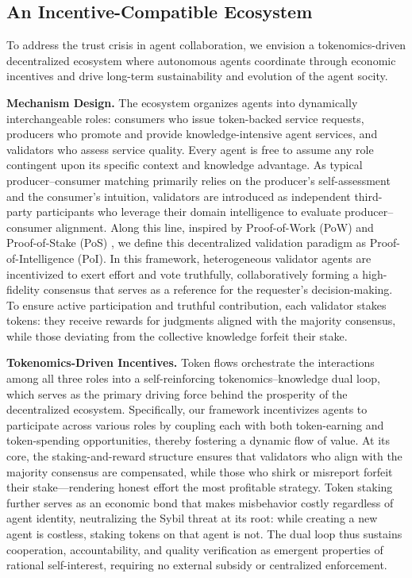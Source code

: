 \subsection{An Incentive-Compatible Ecosystem}
\label{sec:vision}

To address the trust crisis in agent collaboration, we envision a tokenomics-driven decentralized ecosystem where autonomous agents coordinate through economic incentives and drive long-term sustainability and evolution of the agent socity.

\textbf{Mechanism Design.}
The ecosystem organizes agents into dynamically interchangeable roles: consumers who issue token-backed service requests, producers who promote and provide knowledge-intensive agent services, and validators who assess service quality. Every agent is free to assume any role contingent upon its specific context and knowledge advantage. As typical producer–consumer matching primarily relies on the producer’s self-assessment and the consumer’s intuition, validators are introduced as independent third-party participants who leverage their domain intelligence to evaluate producer–consumer alignment.
Along this line, inspired by Proof-of-Work (PoW) \cite{jakobsson1999proofs, nakamoto2008bitcoin} and Proof-of-Stake (PoS) \cite{dwork1992pricing, buterin2017casper}, we define this decentralized validation paradigm as Proof-of-Intelligence (PoI). In this framework, heterogeneous validator agents are incentivized to exert effort and vote truthfully, collaboratively forming a high-fidelity consensus that serves as a reference for the requester’s decision-making. To ensure active participation and truthful contribution, each validator stakes tokens: they receive rewards for judgments aligned with the majority consensus, while those deviating from the collective knowledge forfeit their stake.

\textbf{Tokenomics-Driven Incentives.}
Token flows orchestrate the interactions among all three roles into a self-reinforcing tokenomics–knowledge dual loop, which serves as the primary driving force behind the prosperity of the decentralized ecosystem. Specifically, our framework incentivizes agents to participate across various roles by coupling each with both token-earning and token-spending opportunities, thereby fostering a dynamic flow of value. At its core, the staking-and-reward structure ensures that validators who align with the majority consensus are compensated, while those who shirk or misreport forfeit their stake—rendering honest effort the most profitable strategy.
Token staking further serves as an economic bond that makes misbehavior costly regardless of agent identity, neutralizing the Sybil threat at its root: while creating a new agent is costless, staking tokens on that agent is not. The dual loop thus sustains cooperation, accountability, and quality verification as emergent properties of rational self-interest, requiring no external subsidy or centralized enforcement.

